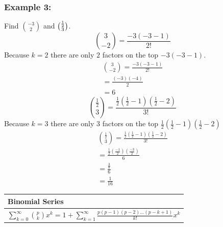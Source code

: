 \documentclass[12pt]{article}
\newcommand{\formula}[2]{
    {\renewcommand{\arraystretch}{2}
        \begin{center}
        \begin{tabular}{|p{0.9\textwidth}|}
        \hline
        \textbf{#1} \\
        \hline
        #2 \\
        \hline
        \end{tabular}
        \end{center}
    }
}
\begin{document}
\subsubsection{Example 3: }
Find $\binom{-3}{2}$ and $\tbinom{\frac{1}{2}}{3}$.
$$\binom{3}{-2} = \frac{-3(-3-1)}{2!}$$
Because $k=2$ there are only $2$ factors on the top $-3(-3-1)$.
\begin{gather*}
\binom{3}{-2} = \frac{-3(-3-1)}{2!} \\
= \frac{(-3)(-4)}{2} \\
= 6
\end{gather*}
$$\binom{\frac{1}{2}}{3} = \frac{\frac{1}{2} (\frac{1}{2} - 1) (\frac{1}{2} - 2)}{3!}$$
Because $k=3$ there are only $3$ factors on the top $\frac{1}{2} (\frac{1}{2} - 1) (\frac{1}{2} - 2)$
\begin{gather*}
\binom{\frac{1}{2}}{3} = \frac{\frac{1}{2} (\frac{1}{2} - 1) (\frac{1}{2} - 2)}{3!} \\
= \frac{\frac{1}{2} (\frac{-1}{2}) (\frac{-3}{2})}{6} \\
= \frac{\frac{3}{8}}{6} \\
= \frac{1}{16}
\end{gather*}

\formula{Binomial Series}{$\sum_{k=0}^{\infty} \binom{p}{k}x^k = 1 + \sum_{k=1}^{\infty} \frac{p(p-1)(p-2) \dotsc (p-k+1)}{k!}x^k$}
\end{document}
